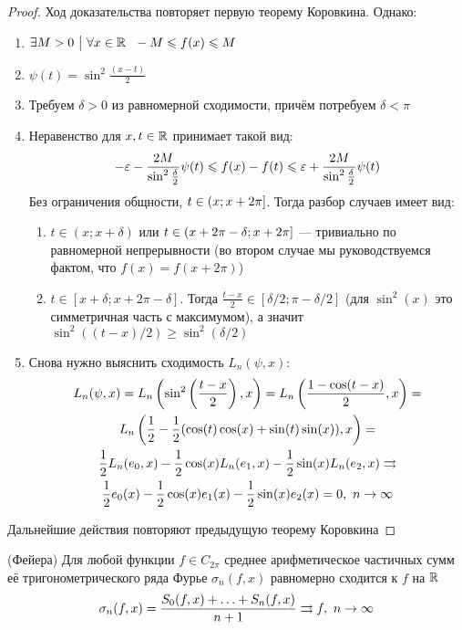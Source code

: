\begin{proof}
	Ход доказательства повторяет первую теорему Коровкина. Однако:
	\begin{enumerate}
		\item $\exists M > 0 \ \big|\  \forall x \in \mathbb{R}\ \ -M \leqslant f(x) \leqslant M$
		
		\item $\psi(t) = \sin^2 \frac{(x - t)}{2}$
		
		\item Требуем $\delta > 0$ из равномерной сходимости, причём потребуем $\delta < \pi$
		
		\item Неравенство для $x, t \in \mathbb{R}$ принимает такой вид:
		\[
			-\varepsilon - \frac{2M}{\sin^2 \frac{\delta}{2}} \psi(t) \leqslant f(x) - f(t) \leqslant \varepsilon + \frac{2M}{\sin^2 \frac{\delta}{2}} \psi(t)
		\]
		Без ограничения общности, $t \in \left(x; x + 2\pi\right]$. Тогда разбор случаев имеет вид:
		\begin{enumerate}
			\item $t \in (x; x + \delta)$ или $t \in \left(x + 2\pi - \delta; x + 2\pi\right]$ --- тривиально по равномерной непрерывности (во втором случае мы руководствуемся фактом, что $f(x) = f(x + 2\pi)$)
			
			\item $t \in [x + \delta; x + 2\pi - \delta]$. Тогда $\frac{t - x}{2} \in [\delta / 2; \pi - \delta / 2]$ (для $\sin^2(x)$ это симметричная часть с максимумом), а значит $\sin^2((t - x) / 2) \ge \sin^2(\delta / 2)$
		\end{enumerate}
		
		\item Снова нужно выяснить сходимость $L_n(\psi, x)$:
		\begin{multline*}
			L_n(\psi, x) = L_n\left(\sin^2\left(\frac{t - x}{2}\right), x\right) = L_n\left(\frac{1 - \cos(t - x)}{2}, x\right) =
			\\
			L_n\left(\frac{1}{2} - \frac{1}{2}(\cos(t)\cos(x) + \sin(t)\sin(x)), x\right) =
			\\
			\frac{1}{2}L_n(e_0, x) - \frac{1}{2}\cos(x)L_n(e_1, x) - \frac{1}{2}\sin(x)L_n(e_2, x) \rightrightarrows
			\\
			\frac{1}{2}e_0(x) - \frac{1}{2}\cos(x)e_1(x) - \frac{1}{2}\sin(x)e_2(x) = 0,\ n \to \infty
		\end{multline*}
	\end{enumerate}
	Дальнейшие действия повторяют предыдущую теорему Коровкина
\end{proof}

\begin{theorem} (Фейера)
	Для любой функции $f \in C_{2\pi}$ среднее арифметическое частичных сумм её тригонометрического ряда Фурье $\sigma_n(f, x)$ равномерно сходится к $f$ на $\mathbb{R}$
	\[
		\sigma_n(f, x) = \frac{S_0(f, x) + \ldots + S_n(f, x)}{n + 1} \rightrightarrows f,\ n \to \infty
	\]
\end{theorem}

